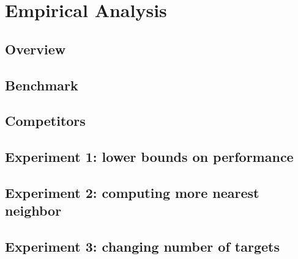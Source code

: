 \chapter{Empirical Analysis}\label{empirical}
\section{Overview}\label{expoverview}
\section{Benchmark}\label{dataset}
\section{Competitors}\label{competitors}
\section{Experiment 1: lower bounds on performance}\label{exp1}
\section{Experiment 2: computing more nearest neighbor}\label{exp2}
\section{Experiment 3: changing number of targets}\label{exp3}

